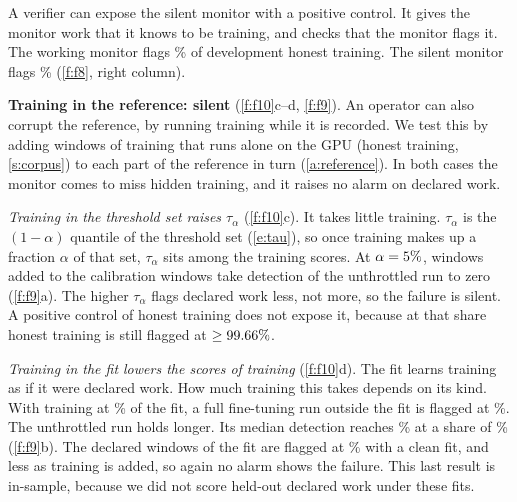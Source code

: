 A verifier can expose the silent monitor with a positive control. It gives the monitor
work that it knows to be training, and checks that the monitor flags it. The working
monitor flags \RoneHonestFull\% of development honest training. The silent monitor flags
\TfourPosCtrl\% (\cref{f:f8}, right column).

\textbf{Training in the reference: silent} (\cref{f:f10}c--d, \cref{f:f9}). An operator can
also corrupt the reference, by running training while it is recorded. We test this by
adding windows of training that runs alone on the GPU (honest training,
\cref{s:corpus}) to each part of the reference in turn (\cref{a:reference}). In both cases the monitor comes to miss hidden training, and it
raises no alarm on declared work.

\emph{Training in the threshold set raises $\tau_\alpha$} (\cref{f:f10}c). It takes little training. $\tau_\alpha$ is the $(1-\alpha)$ quantile of the
threshold set (\cref{e:tau}), so once training makes up a fraction $\alpha$ of that set,
$\tau_\alpha$ sits among the training scores. At
$\alpha = 5\%$, \EthreeKFive{} windows added to the \EthreeCalWindows{}
calibration windows take detection of the unthrottled run to zero (\cref{f:f9}a). The
higher $\tau_\alpha$ flags declared work less, not more, so the failure is silent. A
positive control of honest training does not expose it, because at that share honest
training is still flagged at $\ge 99.66\%$.

\emph{Training in the fit lowers the scores of training} (\cref{f:f10}d). The fit learns
training as if it were declared work. How much training this takes depends on its kind.
With training at \EfourShareHonest\% of the fit, a full fine-tuning run outside the fit
is flagged at \EfourFullCal\%. The unthrottled run holds longer. Its median detection
reaches \EfourGoneDet\% at a share of \EfourShareGone\% (\cref{f:f9}b). The declared
windows of the fit are flagged at \EfourDeclZero\% with a clean fit, and less as training
is added, so again no alarm shows the failure. This last result is in-sample, because we did not
score held-out declared work under these fits.
